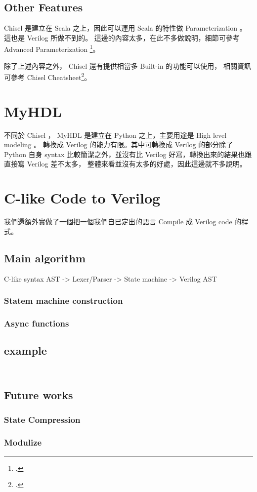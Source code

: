 \documentclass[12pt, a4paper]{article}
\begin{document}
\subsection{Other Features}
Chisel 是建立在 Scala 之上，因此可以運用 Scala 的特性做 Parameterization 。
這也是 Verilog 所做不到的。
這邊的內容太多，在此不多做說明，細節可參考 Advanced Parameterization
\footcite{chisel:adv-param}。

除了上述內容之外， Chisel 還有提供相當多 Built-in 的功能可以使用，
相關資訊可參考 Chisel Cheatsheet\footcite{chisel:cs}。

\section{MyHDL}
不同於 Chisel ， MyHDL 是建立在 Python 之上，主要用途是 High level modeling 。
轉換成 Verilog 的能力有限。其中可轉換成 Verilog 的部分除了 Python 自身 syntax
比較簡潔之外，並沒有比 Verilog 好寫，轉換出來的結果也跟直接寫 Verilog 差不太多，
整體來看並沒有太多的好處，因此這邊就不多說明。

\section{C-like Code to Verilog}
我們還額外實做了一個把一個我們自已定出的語言 Compile 成 Verilog code
的程式。

\subsection{Main algorithm}
C-like syntax AST -> Lexer/Parser -> State machine -> Verilog AST

\subsubsection{Statem machine construction}

\subsubsection{Async functions}

\subsection{example}
\inputminted{ver}{ref-codes/f.ver}

\inputminted{ver}{ref-codes/g.ver}

\subsection{Future works}
\subsubsection{State Compression}

\subsubsection{Modulize}
\end{document}
